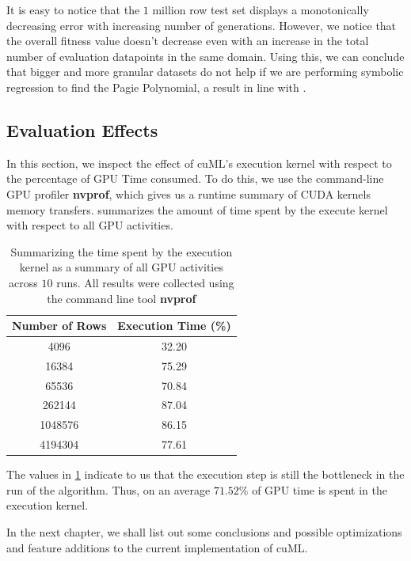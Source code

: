 It is easy to notice that the $1$ million row test set displays a monotonically decreasing error with increasing number of generations. However, we notice that the overall fitness value doesn't decrease even with an increase in the total number of evaluation datapoints in the same domain. Using this, we can conclude that bigger and more granular datasets do not help if we are performing symbolic regression to find the Pagie Polynomial, a result in line with \citep{baeta2021speed}.

\subsection{Evaluation Effects}
\label{sec:evaleffects}
In this section, we inspect the effect of cuML's execution kernel with respect to the percentage of GPU Time consumed. To do this, we use the command-line GPU profiler \textbf{nvprof}, which gives us a runtime summary of CUDA kernels memory transfers.  summarizes the amount of time spent by the execute kernel with respect to all GPU activities. 

\begin{table}[htbp]
  \caption{Summarizing the time spent by the execution kernel as a summary of all GPU activities across $10$ runs. All results were collected using the command line tool \textbf{nvprof}}
  \begin{center}
    \begin{tabular}[c]{cc}
      \toprule
      \textbf{Number of Rows} & \textbf{Execution Time (\%)} \\
      \midrule
      4096    & 32.20\\
      16384   & 75.29\\
      65536   & 70.84\\
      262144  & 87.04\\ 
      1048576 & 86.15\\
      4194304 & 77.61\\
      \bottomrule
    \end{tabular}
    \label{tab:nvprofexec}
  \end{center}
\end{table}

The values in \cref*{tab:nvprofexec} indicate to us that the execution step is still the bottleneck in the run of the algorithm. Thus, on an average $71.52\%$ of GPU time is spent in the execution kernel.

In the next chapter, we shall list out some conclusions and possible optimizations and feature additions to the current implementation of cuML. 

